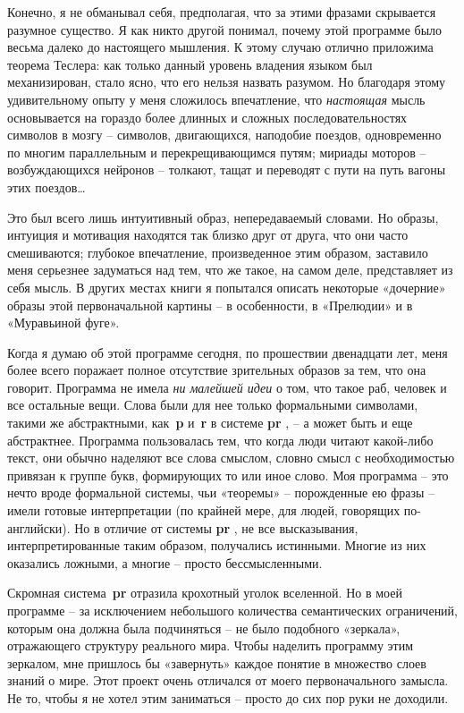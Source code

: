 \documentclass[../main.tex]{subfiles}
\begin{document}
Конечно, я не обманывал себя, предполагая, что за этими фразами скрывается разумное существо. Я как никто другой понимал, почему этой программе было весьма далеко до настоящего мышления. К этому случаю отлично приложима теорема Теслера: как только данный уровень владения языком был механизирован, стало ясно, что его нельзя назвать разумом. Но благодаря этому удивительному опыту у меня сложилось впечатление, что \emph{настоящая} мысль основывается на гораздо более длинных и сложных последовательностях символов в мозгу \--- символов, двигающихся, наподобие поездов, одновременно по многим параллельным и перекрещивающимся путям; мириады моторов \--- возбуждающихся нейронов \--- толкают, тащат и переводят с пути на путь вагоны этих поездов\ldots{}

Это был всего лишь интуитивный образ, непередаваемый словами. Но образы, интуиция и мотивация находятся так близко друг от друга, что они часто смешиваются; глубокое впечатление, произведенное этим образом, заставило меня серьезнее задуматься над тем, что же такое, на самом деле, представляет из себя мысль. В других местах книги я попытался описать некоторые «дочерние» образы этой первоначальной картины \--- в особенности, в «Прелюдии» и в «Муравьиной фуге».

Когда я думаю об этой программе сегодня, по прошествии двенадцати лет, меня более всего поражает полное отсутствие зрительных образов за тем, что она говорит. Программа не имела \emph{ни малейшей идеи} о том, что такое раб, человек и все остальные вещи. Слова были для нее только формальными символами, такими же абстрактными, как~\textbf{p} и~\textbf{r} в системе \textbf{pr} , \--- а может быть и еще абстрактнее. Программа пользовалась тем, что когда люди читают какой-либо текст, они обычно наделяют все слова смыслом, словно смысл с необходимостью привязан к группе букв, формирующих то или иное слово. Моя программа \--- это нечто вроде формальной системы, чьи «теоремы» \--- порожденные ею фразы \--- имели готовые интерпретации (по крайней мере, для людей, говорящих по-английски). Но в отличие от системы \textbf{pr} , не все высказывания, интерпретированные таким образом, получались истинными. Многие из них оказались ложными, а многие \--- просто бессмысленными.

Скромная система~\textbf{pr} отразила крохотный уголок вселенной. Но в моей программе \--- за исключением небольшого количества семантических ограничений, которым она должна была подчиняться \--- не было подобного «зеркала», отражающего структуру реального мира. Чтобы наделить программу этим зеркалом, мне пришлось бы «завернуть» каждое понятие в множество слоев знаний о мире. Этот проект очень отличался от моего первоначального замысла. Не то, чтобы я не хотел этим заниматься \--- просто до сих пор руки не доходили.
\end{document}
